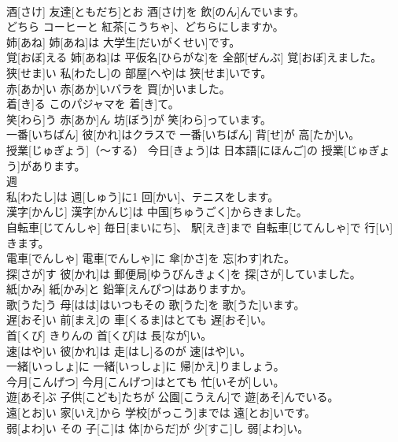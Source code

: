 \documentclass[8pt]{extreport}
\begin{document}
\begin{CJK}{UTF8}{min}
\\	酒[さけ]	友達[ともだち]とお 酒[さけ]を 飲[のん]んでいます。		
\\	どちら	コーヒーと 紅茶[こうちゃ]、どちらにしますか。		
\\	姉[あね]	姉[あね]は 大学生[だいがくせい]です。		
\\	覚[おぼ]える	姉[あね]は 平仮名[ひらがな]を 全部[ぜんぶ] 覚[おぼ]えました。		
\\	狭[せま]い	私[わたし]の 部屋[へや]は 狭[せま]いです。		
\\	赤[あか]い	赤[あか]いバラを 買[か]いました。		
\\	着[き]る	このパジャマを 着[き]て。		
\\	笑[わら]う	赤[あか]ん 坊[ぼう]が 笑[わら]っています。		
\\	一番[いちばん]	彼[かれ]はクラスで 一番[いちばん] 背[せ]が 高[たか]い。		
\\	授業[じゅぎょう]（～する）	今日[きょう]は 日本語[にほんご]の 授業[じゅぎょう]があります。		
\\	週
\\	[しゅう]	私[わたし]は 週[しゅう]に1 回[かい]、テニスをします。		
\\	漢字[かんじ]	漢字[かんじ]は 中国[ちゅうごく]からきました。		
\\	自転車[じてんしゃ]	毎日[まいにち]、 駅[えき]まで 自転車[じてんしゃ]で 行[い]きます。		
\\	電車[でんしゃ]	電車[でんしゃ]に 傘[かさ]を 忘[わす]れた。		
\\	探[さが]す	彼[かれ]は 郵便局[ゆうびんきょく]を 探[さが]していました。		
\\	紙[かみ]	紙[かみ]と 鉛筆[えんぴつ]はありますか。		
\\	歌[うた]う	母[はは]はいつもその 歌[うた]を 歌[うた]います。		
\\	遅[おそ]い	前[まえ]の 車[くるま]はとても 遅[おそ]い。		
\\	首[くび]	きりんの 首[くび]は 長[なが]い。		
\\	速[はや]い	彼[かれ]は 走[はし]るのが 速[はや]い。		
\\	一緒[いっしょ]に	一緒[いっしょ]に 帰[かえ]りましょう。		
\\	今月[こんげつ]	今月[こんげつ]はとても 忙[いそが]しい。		
\\	遊[あそ]ぶ	子供[こども]たちが 公園[こうえん]で 遊[あそ]んでいる。		
\\	遠[とお]い	家[いえ]から 学校[がっこう]までは 遠[とお]いです。		
\\	弱[よわ]い	その 子[こ]は 体[からだ]が 少[すこ]し 弱[よわ]い。		

\end{CJK}
\end{document}
